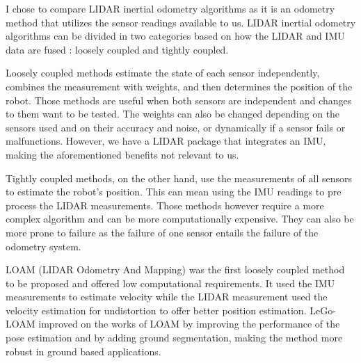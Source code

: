 \documentclass[12pt]{article}
\begin{document}
        I chose to compare LIDAR inertial odometry algorithms as it is an odometry method that utilizes the sensor readings available to us. LIDAR inertial odometry algorithms can be divided in two categories based on how the LIDAR and IMU data are fused : loosely coupled and tightly coupled.

        Loosely coupled methods estimate the state of each sensor independently, combines the measurement with weights, and then determines the position of the robot. Those methods are useful when both sensors are independent and changes to them want to be tested. The weights can also be changed depending on the sensors used and on their accuracy and noise, or dynamically if a sensor fails or malfunctions. However, we have a LIDAR package that integrates an IMU, making the aforementioned benefits not relevant to us.

        Tightly coupled methods, on the other hand, use the measurements of all sensors to estimate the robot's position. This can mean using the IMU readings to pre process the LIDAR measurements. Those methods however require a more complex algorithm and can be more computationally expensive. They can also be more prone to failure as the failure of one sensor entails the failure of the odometry system.


        LOAM (LIDAR Odometry And Mapping) \cite{lee2024lidar} was the first loosely coupled method to be proposed and offered low computational requirements. It used the IMU measurements to estimate velocity while the LIDAR measurement used the velocity estimation for undistortion to offer better position estimation. LeGo-LOAM \cite{shan2018lego} improved on the works of LOAM by improving the performance of the pose estimation and by adding ground segmentation, making the method more robust in ground based applications.
\end{document}
